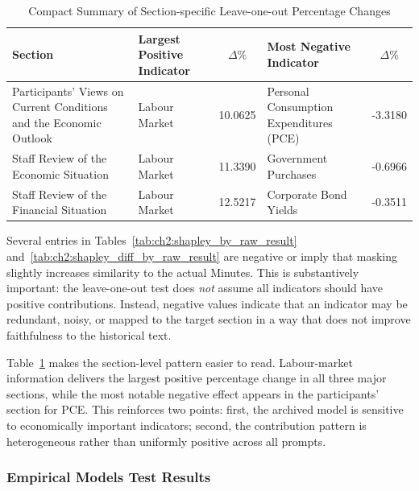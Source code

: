 \begin{table}[htbp]
    \centering
    \footnotesize
    \begin{tabular}{p{} p{} c p{} c}
        \toprule
        \textbf{Section} & \textbf{Largest Positive Indicator} & \textbf{$\Delta\%$} & \textbf{Most Negative Indicator} & \textbf{$\Delta\%$} \\
        \midrule
        Participants' Views on Current Conditions and the Economic Outlook & Labour Market & 10.0625 & Personal Consumption Expenditures (PCE) & -3.3180 \\
        Staff Review of the Economic Situation & Labour Market & 11.3390 & Government Purchases & -0.6966 \\
        Staff Review of the Financial Situation & Labour Market & 12.5217 & Corporate Bond Yields & -0.3511 \\
        \bottomrule
    \end{tabular}
    \caption{Compact Summary of Section-specific Leave-one-out Percentage Changes}
    \label{tab:ch2:loo_delta_summary}
\end{table}

Several entries in Tables~\ref{tab:ch2:shapley_by_raw_result} and~\ref{tab:ch2:shapley_diff_by_raw_result} are negative or imply that masking slightly increases similarity to the actual Minutes. This is substantively important: the leave-one-out test does \textit{not} assume all indicators should have positive contributions. Instead, negative values indicate that an indicator may be redundant, noisy, or mapped to the target section in a way that does not improve faithfulness to the historical text.

Table~\ref{tab:ch2:loo_delta_summary} makes the section-level pattern easier to read. Labour-market information delivers the largest positive percentage change in all three major sections, while the most notable negative effect appears in the participants' section for PCE. This reinforces two points: first, the archived model is sensitive to economically important indicators; second, the contribution pattern is heterogeneous rather than uniformly positive across all prompts.








\subsubsection*{Empirical Models Test Results}

